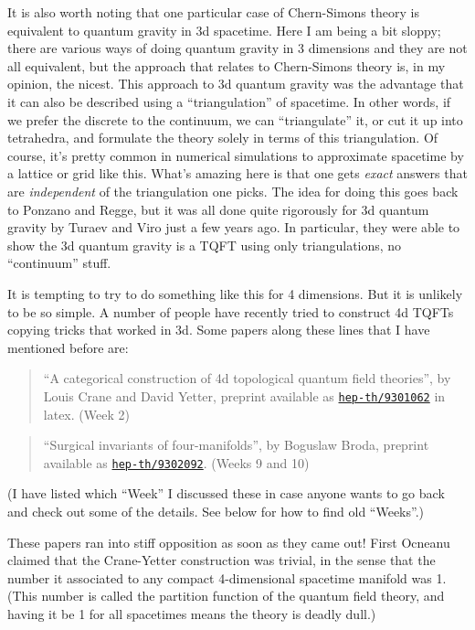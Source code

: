 \documentclass{article}
\begin{document}
It is also worth noting that one particular case of Chern-Simons theory
is equivalent to quantum gravity in 3d spacetime. Here I am being a bit
sloppy; there are various ways of doing quantum gravity in 3 dimensions
and they are not all equivalent, but the approach that relates to
Chern-Simons theory is, in my opinion, the nicest. This approach to 3d
quantum gravity was the advantage that it can also be described using a
``triangulation'' of spacetime. In other words, if we prefer the
discrete to the continuum, we can ``triangulate'' it, or cut it up into
tetrahedra, and formulate the theory solely in terms of this
triangulation. Of course, it's pretty common in numerical simulations to
approximate spacetime by a lattice or grid like this. What's amazing
here is that one gets \emph{exact} answers that are \emph{independent}
of the triangulation one picks. The idea for doing this goes back to
Ponzano and Regge, but it was all done quite rigorously for 3d quantum
gravity by Turaev and Viro just a few years ago. In particular, they
were able to show the 3d quantum gravity is a TQFT using only
triangulations, no ``continuum'' stuff.

It is tempting to try to do something like this for 4 dimensions. But it
is unlikely to be so simple. A number of people have recently tried to
construct 4d TQFTs copying tricks that worked in 3d. Some papers along
these lines that I have mentioned before are:

\begin{quote}
``A categorical construction of 4d topological quantum field theories'',
by Louis Crane and David Yetter, preprint available as
\href{http://xxx.lanl.gov/abs/hep-th/9301062}{\texttt{hep-th/9301062}}
in latex. (Week 2)
\end{quote}

\begin{quote}
``Surgical invariants of four-manifolds'', by Boguslaw Broda, preprint
available as
\href{http://xxx.lanl.gov/abs/hep-th/9302092}{\texttt{hep-th/9302092}}.
(Weeks 9 and 10)
\end{quote}

(I have listed which ``Week'' I discussed these in case anyone wants to
go back and check out some of the details. See below for how to find old
``Weeks''.)

These papers ran into stiff opposition as soon as they came out! First
Ocneanu claimed that the Crane-Yetter construction was trivial, in the
sense that the number it associated to any compact 4-dimensional
spacetime manifold was 1. (This number is called the partition function
of the quantum field theory, and having it be 1 for all spacetimes means
the theory is deadly dull.)
\end{document}
